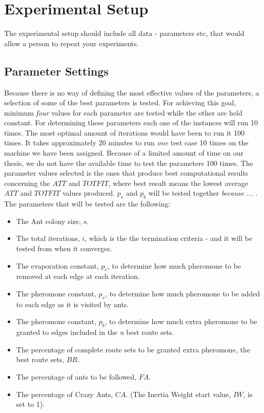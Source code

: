 \section{Experimental Setup}

The experimental setup should include all data - parameters etc, that would allow a person to repeat your experiments. 
 
\subsection{Parameter Settings}
\label{subsec:parameterSettings_setup}

Because there is no way of defining the most effective values of the parameters, a selection of some of the best parameters is tested. For achieving this goal, minimum \textit{four} values for each parameter are tested while the other are held constant. For determining these parameters each one of the instances will run 10 times. The most optimal amount of iterations would have been to run it 100 times. It takes approximately 20 minutes to run \textit{one} test case 10 times on the machine we have been assigned. Because of a limited amount of time on our thesis, we do not have the available time to test the parameters 100 times. The parameter values selected is the ones that produce best computational results concerning the $ATT$ and $TOTFIT$, where best result means the lowest average $ATT$ and $TOTFIT$ values produced. $p_{v}$ and $p_{b}$ will be tested together \emph{\color{red}because ... }. The parameters that will be tested are the following:

\begin{itemize}
\item The Ant colony size, $s$.
\item The total iterations, $i$, which is the the termination criteria - and it will be tested from when it converges. 
\item The evaporation constant, $p_{e}$, to determine how much pheromone to be removed at each edge at each iteration. 
\item The pheromone constant, $p_{v}$, to determine how much pheromone to be added to each edge as it is visited by ants. 
\item The pheromone constant, $p_{b}$, to determine how much extra pheromone to be granted to edges included in the \textit{n} best route sets.
\item The percentage of complete route sets to be granted extra pheromone, the best route sets, $BR$.
\item The percentage of ants to be followed, $FA$.
\item The percentage of Crazy Ants, $CA$. (The Inertia Weight start value, $IW$, is set to 1). 
\end{itemize}

